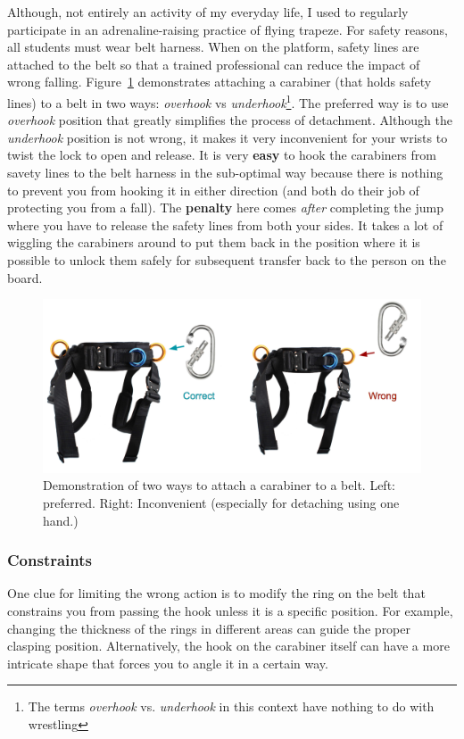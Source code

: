 \documentclass[12pt,letterpaper]{article}
\begin{document}
Although, not entirely an activity of my everyday life, I used to regularly participate in an adrenaline-raising practice of flying trapeze. For safety reasons, all students must wear belt harness. When on the platform, safety lines are attached to the belt so that a trained professional can reduce the impact of wrong falling. Figure~\ref{fig::1} demonstrates attaching a carabiner (that holds safety lines) to a belt in two ways: \textit{overhook} vs \textit{underhook}\footnote{The terms \textit{overhook} vs. \textit{underhook} in this context have nothing to do with wrestling}. The preferred way is to use \textit{overhook} position that greatly simplifies the process of detachment. Although the \textit{underhook} position is not wrong, it makes it very inconvenient for your wrists to twist the lock to open and release. It is very \textbf{easy} to hook the carabiners from savety lines to the belt harness in the sub-optimal way because there is nothing to prevent you from hooking it in either direction (and both do their job of protecting you from a fall). The \textbf{penalty} here comes \textit{after} completing the jump where you have to release the safety lines from both your sides. It takes a lot of wiggling the carabiners around to put them back in the position where it is possible to unlock them safely for subsequent transfer back to the person on the board.   

\begin{figure}[h]
\centering
\includegraphics[scale=.35]{figures/p3/flying_trapeze.png}
\caption{Demonstration of two ways to attach a carabiner to a belt. Left: preferred. Right: Inconvenient (especially for detaching using one hand.)}
\label{fig::1}
\end{figure}

\subsubsection*{Constraints}
One clue for limiting the wrong action is to modify the ring on the belt that constrains you from passing the hook unless it is a specific position. For example, changing the thickness of the rings in different areas can guide the proper clasping position. Alternatively, the hook on the carabiner itself can have a more intricate shape that forces you to angle it in a certain way.
\end{document}
